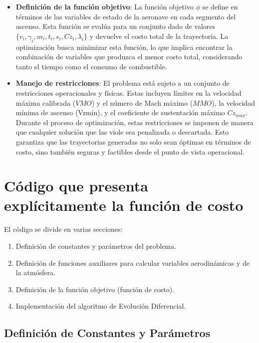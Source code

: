 \documentclass[fleqn]{article}
\begin{document}
\begin{itemize}
    \item \textbf{Definición de la función objetivo}: La función objetivo $\phi$ se define en términos de las variables de estado de la aeronave en cada segmento del ascenso. Esta función se evalúa para un conjunto dado de valores $\{v_i, \gamma_i, m_i, t_i, s_i, Cz_i, \lambda_i\}$ y devuelve el costo total de la trayectoria. La optimización busca minimizar esta función, lo que implica encontrar la combinación de variables que produzca el menor costo total, considerando tanto el tiempo como el consumo de combustible.

    \item \textbf{Manejo de restricciones}: El problema está sujeto a un conjunto de restricciones operacionales y físicas. Estas incluyen límites en la velocidad máxima calibrada ($VMO$) y el número de Mach máximo ($MMO$), la velocidad mínima de ascenso (Vzmin), y el coeficiente de sustentación máximo $Cz_{max}$. Durante el proceso de optimización, estas restricciones se imponen de manera que cualquier solución que las viole sea penalizada o descartada. Esto garantiza que las trayectorias generadas no solo sean óptimas en términos de costo, sino también seguras y factibles desde el punto de vista operacional.
\end{itemize}


\section{Código que presenta explícitamente la función de costo}


El código se divide en varias secciones:

\begin{enumerate}
    \item Definición de constantes y parámetros del problema.
    \item Definición de funciones auxiliares para calcular variables aerodinámicas y de la atmósfera.
    \item Definición de la función objetivo (función de costo).
    \item Implementación del algoritmo de Evolución Diferencial.
\end{enumerate}

\subsection{Definición de Constantes y Parámetros}
\end{document}
